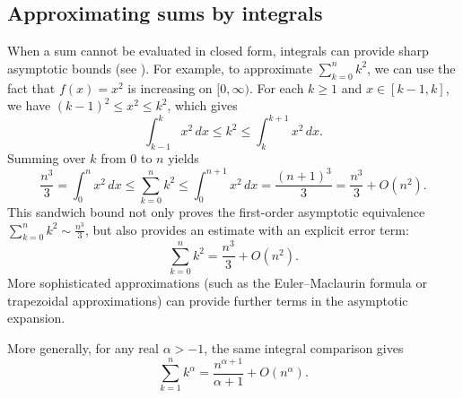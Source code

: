 \subsection*{Approximating sums by integrals}

When a sum cannot be evaluated in closed form, integrals can provide sharp asymptotic bounds (see \cite[Chapter 11]{MelczerNotes}).
For example, to approximate \(\sum_{k=0}^n k^2\), we can use the fact that \(f(x) = x^2\) is increasing on \([0, \infty)\).
For each \(k \ge 1\) and \(x \in [k-1, k]\), we have \((k-1)^2 \le x^2 \le k^2\), which gives
\[
    \int_{k-1}^k x^2 \, dx \le k^2 \le \int_k^{k+1} x^2 \, dx.
\]
Summing over \(k\) from \(0\) to \(n\) yields
\[
    \frac{n^3}{3} = \int_0^n x^2 \, dx \le \sum_{k=0}^n k^2 \le \int_0^{n+1} x^2 \, dx = \frac{(n+1)^3}{3} = \frac{n^3}{3} + O(n^2).
\]
This sandwich bound not only proves the first-order asymptotic equivalence \(\sum_{k=0}^n k^2 \sim \frac{n^3}{3}\), but also provides an estimate with an explicit error term:
\[
    \sum_{k=0}^n k^2 = \frac{n^3}{3} + O(n^2).
\]
More sophisticated approximations (such as the Euler--Maclaurin formula or trapezoidal approximations) can provide further terms in the asymptotic expansion.

More generally, for any real \(\alpha > -1\), the same integral comparison gives
\[
    \sum_{k=1}^n k^\alpha = \frac{n^{\alpha+1}}{\alpha+1} + O(n^\alpha).
\]